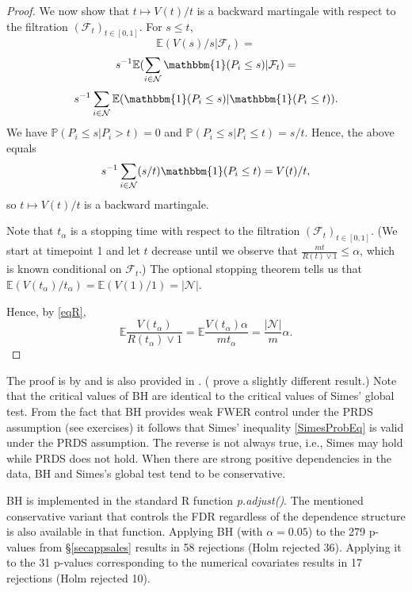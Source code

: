 \documentclass[11pt]{article}
\theoremstyle{plain}
\newtheorem{theorem}{Theorem}[section]
\theoremstyle{definition}
\newcommand{\N}{\mathcal{N}}
\newcommand{\pr}{\mathbb{P}}
\newcommand{\citt}{\citet}
\begin{document}
\begin{proof}
We now show that  $t\mapsto V(t)/t$ is a backward martingale with respect to the filtration $(\mathcal{F}_t)_{t\in [0,1]}$.
For $s\leq t$,
$$ \mathbb{E} (V(s)/s|\mathcal{F}_t) = $$
$$s^{-1}\mathbb{E} (\sum_{i\in \N}\mathbbm{1}(P_i\leq s)|\mathcal{F}_t)=$$
$$ s^{-1}\sum_{i\in \N}\mathbb{E}(\mathbbm{1}(P_i\leq s)|\mathbbm{1}(P_i\leq t)). $$
We have $\pr(P_i\leq s|P_i>t)=0$ and $\pr(P_i\leq s|P_i\leq t)=s/t$.
Hence, the above equals
$$ s^{-1}\sum_{i\in \N} (s/t)  \mathbbm{1}(P_i\leq t)  =V(t)/t,$$
so $t\mapsto V(t)/t$ is a backward martingale.


Note that $t_{\alpha}$ is a stopping time with respect to the filtration $(\mathcal{F}_t)_{t\in[0,1]}$. (We start at timepoint 1 and let $t$ decrease until we observe that  $\frac{mt}{R(t)\vee 1}\leq \alpha$, which is known  conditional on $\mathcal{F}_t$.) The optional stopping theorem tells us that $\mathbb{E}(V(t_{\alpha})/t_{\alpha})= \mathbb{E}(V(1)/1)=|\N|$.

Hence, by \eqref{eqR},
$$\mathbb{E}\frac{V(t_{\alpha})}{R(t_{\alpha})\vee 1} =  \mathbb{E}\frac{V(t_{\alpha})\alpha}{mt_{\alpha}} =\frac{|\N|}{m}\alpha.$$
\end{proof}




The proof is by \citt{finner2009false} and is also provided in  \citt{wang2022elementary}. (\citealp{benjamini2001control} prove a slightly different result.) 
Note that the critical values of BH are identical to the critical values of Simes' global test. From the fact that BH provides weak FWER control under the PRDS assumption (see exercises) it follows that Simes' inequality \eqref{SimesProbEq} is valid under  the PRDS assumption. The reverse is not always true, i.e., Simes may hold while PRDS does not hold. When there are strong positive dependencies in the data, BH and Simes's global test tend to be conservative.


BH is implemented in the standard R function \emph{p.adjust()}. The mentioned  conservative variant that controls the FDR regardless of the dependence structure \citep{benjamini2001control} is also available in that function.
Applying BH (with $\alpha=0.05$) to the 279 p-values from  \S\ref{secappsales} results in     58 rejections (Holm rejected 36).  Applying it to the 31 p-values   corresponding to the numerical covariates results in 17 rejections (Holm rejected 10).
\end{document}
